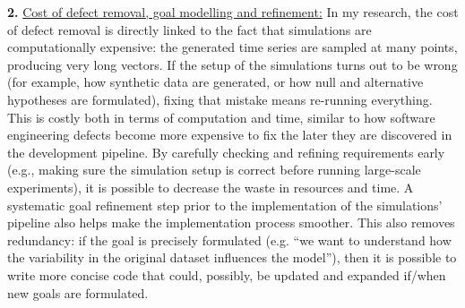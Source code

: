 \textbf{2.} \underline{Cost of defect removal, goal modelling and refinement:} In my research, the cost of defect removal is directly linked to the fact that simulations are computationally expensive: the generated time series are sampled at many points, producing very long vectors. If the setup of the simulations turns out to be wrong (for example, how synthetic data are generated, or how null and alternative hypotheses are formulated), fixing that mistake means re-running everything. This is costly both in terms of computation and time, similar to how software engineering defects become more expensive to fix the later they are discovered in the development pipeline. By carefully checking and refining requirements early (e.g., making sure the simulation setup is correct before running large-scale experiments), it is possible to decrease the waste in resources and time. A systematic goal refinement step prior to the implementation of the simulations’ pipeline also helps make the implementation process smoother. This also removes redundancy: if the goal is precisely formulated (e.g. “we want to understand how the variability in the original dataset influences the model”), then it is possible to write more concise code that could, possibly, be updated and expanded if/when new goals are formulated.
